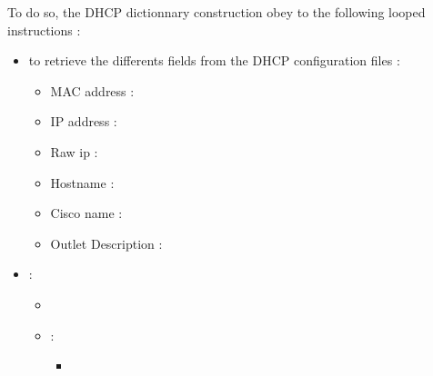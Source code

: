 \documentclass[letterpaper,10pt,english]{sphinxmanual}
\begin{document}
\sphinxAtStartPar
To do so, the DHCP dictionnary construction obey to the following looped instructions :
\begin{itemize}
\item {} 
\sphinxAtStartPar
{} to retrieve the differents fields from the DHCP configuration files :
\begin{itemize}
\item {} 
\sphinxAtStartPar
MAC address : 

\item {} 
\sphinxAtStartPar
IP address : 

\item {} 
\sphinxAtStartPar
Raw ip : 

\item {} 
\sphinxAtStartPar
Hostname : 

\item {} 
\sphinxAtStartPar
Cisco name : 

\item {} 
\sphinxAtStartPar
Outlet Description : \sphinxstylestrong{{[}NRJPASEP{]}+{[}0\sphinxhyphen{}9{]}+{[}A\sphinxhyphen{}K{]}{[}0\sphinxhyphen{}9{]}+\sphinxhyphen{}{[}0\sphinxhyphen{}9{]}+}

\end{itemize}

\item {} 
\sphinxAtStartPar
{} :
\begin{itemize}
\item {} 
\sphinxAtStartPar
{}

\item {} 
\sphinxAtStartPar
{} :
\begin{itemize}
\item {} 
\sphinxAtStartPar
{}


\end{itemize}
\end{itemize}
\end{itemize}
\end{document}

